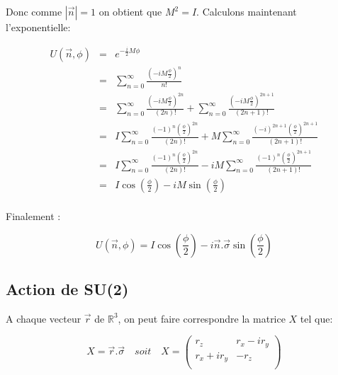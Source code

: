 \documentclass[12pt,a4paper]{article}
\begin{document}
Donc comme $|\vec{n}|=1$ on obtient que $\boxed{M^2=I}$. Calculons maintenant l'exponentielle:

\begin{eqnarray*}
U(\vec{n},\phi) &=& e^{-\frac{i}{2} M \phi}\\
&=& \sum_{n=0}^{\infty} \frac{(-i M \frac{\phi}{2})^n}{n!} \\
&=& \sum_{n=0}^{\infty} \frac{(-i M \frac{\phi}{2})^{2n}}{(2n)!} +\sum_{n=0}^{\infty} \frac{(-i M \frac{\phi}{2})^{2n+1}}{(2n+1)!} \\
&=& I \sum_{n=0}^{\infty} \frac{(-1)^n (\frac{\phi}{2})^{2n}}{(2n)!} +M\sum_{n=0}^{\infty} \frac{(-i)^{2n+1} (\frac{\phi}{2})^{2n+1}}{(2n+1)!} \\
&=& I \sum_{n=0}^{\infty} \frac{(-1)^n (\frac{\phi}{2})^{2n}}{(2n)!}-i M\sum_{n=0}^{\infty} \frac{(-1)^{n} (\frac{\phi}{2})^{2n+1}}{(2n+1)!} \\
&=& I \cos\left(\frac{\phi}{2}\right)-i M \sin\left(\frac{\phi}{2}\right)\\
\end{eqnarray*}

Finalement :

\[
\boxed{U(\vec{n},\phi)= I \cos\left(\frac{\phi}{2}\right)-i \vec{n}.\vec{\sigma} \sin\left(\frac{\phi}{2}\right)}
\]

\newpage
\subsection{Action de SU(2)}

A chaque vecteur $\vec{r}$ de $\mathbb{R}^3$, on peut faire correspondre la matrice $X$ tel que:

\[
	\boxed{X=\vec{r}.\vec{\sigma}} \quad soit \quad X=\begin{pmatrix}
	r_z&r_x-i r_y\\
	r_x+i r_y&-r_z\\
	\end{pmatrix}
\]
\end{document}
